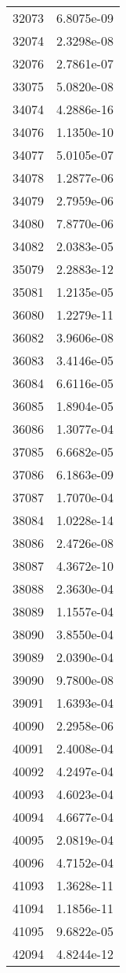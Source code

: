 \begin{table}[h!]
\begin{tabular}{|| c || c |}
32073 & 6.8075e-09 \\
32074 & 2.3298e-08 \\
32076 & 2.7861e-07 \\
33075 & 5.0820e-08 \\
34074 & 4.2886e-16 \\
34076 & 1.1350e-10 \\
34077 & 5.0105e-07 \\
34078 & 1.2877e-06 \\
34079 & 2.7959e-06 \\
34080 & 7.8770e-06 \\
34082 & 2.0383e-05 \\
35079 & 2.2883e-12 \\
35081 & 1.2135e-05 \\
36080 & 1.2279e-11 \\
36082 & 3.9606e-08 \\
36083 & 3.4146e-05 \\
36084 & 6.6116e-05 \\
36085 & 1.8904e-05 \\
36086 & 1.3077e-04 \\
37085 & 6.6682e-05 \\
37086 & 6.1863e-09 \\
37087 & 1.7070e-04 \\
38084 & 1.0228e-14 \\
38086 & 2.4726e-08 \\
38087 & 4.3672e-10 \\
38088 & 2.3630e-04 \\
38089 & 1.1557e-04 \\
38090 & 3.8550e-04 \\
39089 & 2.0390e-04 \\
39090 & 9.7800e-08 \\
39091 & 1.6393e-04 \\
40090 & 2.2958e-06 \\
40091 & 2.4008e-04 \\
40092 & 4.2497e-04 \\
40093 & 4.6023e-04 \\
40094 & 4.6677e-04 \\
40095 & 2.0819e-04 \\
40096 & 4.7152e-04 \\
41093 & 1.3628e-11 \\
41094 & 1.1856e-11 \\
41095 & 9.6822e-05 \\
42094 & 4.8244e-12 \\

\end{tabular}
\end{table}
